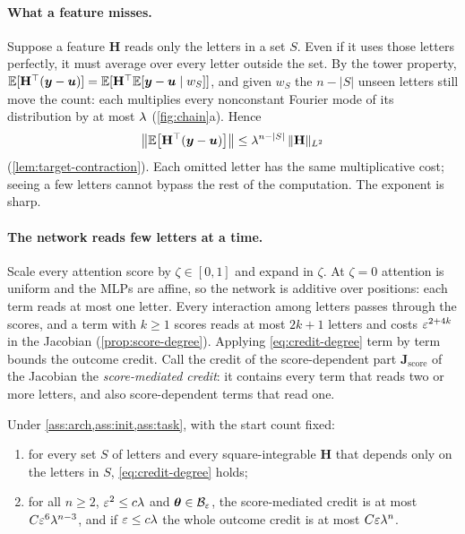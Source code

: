 \paragraph{What a feature misses.} Suppose a feature $\mathbf H$ reads only the letters in a set $S$. Even if it uses those letters perfectly,
it must average over every letter outside the set. By the tower property,
$\mathbb E[\mathbf H^\top(\bm y-\bm u)]=\mathbb E[\mathbf H^\top\mathbb E[\bm y-\bm u\mid w_S]]$, and given $w_S$ the $n-|S|$ unseen letters still move the count: each
multiplies every nonconstant Fourier mode of its distribution by at most $\lambda$ (\cref{fig:chain}a). Hence
\begin{equation}
 \bigl\|\mathbb E\bigl[\mathbf H^\top(\bm y-\bm u)\bigr]\bigr\|\le\lambda^{n-|S|}\,\|\mathbf H\|_{L^2}
 \label{eq:credit-degree}
\end{equation}
(\cref{lem:target-contraction}). Each omitted letter has the same multiplicative cost; seeing a few letters cannot bypass the rest of
the computation. The exponent is sharp.

\paragraph{The network reads few letters at a time.} Scale every attention score by $\zeta\in[0,1]$ and expand in $\zeta$. At $\zeta=0$ attention is uniform
and the MLPs are affine, so the network is additive over positions: each term reads at most one letter. Every interaction among letters
passes through the scores, and a term with $k\ge1$ scores reads at most $2k+1$ letters and costs $\varepsilon^{2+4k}$ in the Jacobian
(\cref{prop:score-degree}). Applying \cref{eq:credit-degree} term by term bounds the outcome credit. Call the credit of the score-dependent part
$\mathbf J_{\mathrm{score}}$ of the Jacobian the \emph{score-mediated credit}: it contains every term that reads two or more letters, and
also score-dependent terms that read one.

\begin{theorem}
\label{thm:main}
Under \cref{ass:arch,ass:init,ass:task}, with the start count fixed:
\begin{enumerate}[label=(\roman*),leftmargin=*,itemsep=0pt,topsep=2pt]
\item for every set $S$ of letters and every square-integrable $\mathbf H$ that depends only on the letters in $S$, \cref{eq:credit-degree} holds;
\item for all $n\ge2$, $\varepsilon^2\le c\lambda$ and $\bm\theta\in\mathcal B_{\varepsilon}$, the score-mediated credit is at most $C\varepsilon^6\lambda^{n-3}$, and if
$\varepsilon\le c\lambda$ the whole outcome credit is at most $C\varepsilon\lambda^n$.
\end{enumerate}
\end{theorem}

